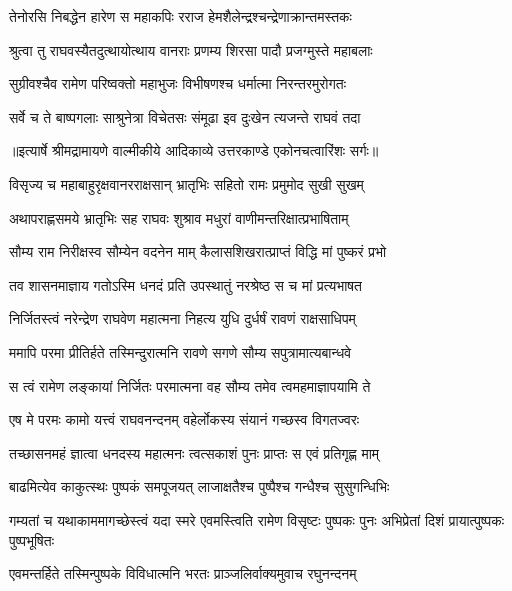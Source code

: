 \twolineshloka
{तेनोरसि निबद्धेन हारेण स महाकपिः}
{रराज हेमशैलेन्द्रश्चन्द्रेणाक्रान्तमस्तकः} %

\twolineshloka
{श्रुत्वा तु राघवस्यैतदुत्थायोत्थाय वानराः}
{प्रणम्य शिरसा पादौ प्रजग्मुस्ते महाबलाः} %

\twolineshloka
{सुग्रीवश्चैव रामेण परिष्वक्तो महाभुजः}
{विभीषणश्च धर्मात्मा निरन्तरमुरोगतः} %

\twolineshloka
{सर्वे च ते बाष्पगलाः साश्रुनेत्रा विचेतसः}
{संमूढा इव दुःखेन त्यजन्ते राघवं तदा} %


{॥इत्यार्षे श्रीमद्रामायणे वाल्मीकीये आदिकाव्ये उत्तरकाण्डे एकोनचत्वारिंशः सर्गः॥}


\twolineshloka
{विसृज्य च महाबाहुरृक्षवानरराक्षसान्}
{भ्रातृभिः सहितो रामः प्रमुमोद सुखी सुखम्} %

\twolineshloka
{अथापराह्णसमये भ्रातृभिः सह राघवः}
{शुश्राव मधुरां वाणीमन्तरिक्षात्प्रभाषिताम्} %

\twolineshloka
{सौम्य राम निरीक्षस्व सौम्येन वदनेन माम्}
{कैलासशिखरात्प्राप्तं विद्धि मां पुष्करं प्रभो} %

\twolineshloka
{तव शासनमाज्ञाय गतोऽस्मि धनदं प्रति}
{उपस्थातुं नरश्रेष्ठ स च मां प्रत्यभाषत} %

\twolineshloka
{निर्जितस्त्वं नरेन्द्रेण राघवेण महात्मना}
{निहत्य युधि दुर्धर्षं रावणं राक्षसाधिपम्} %

\twolineshloka
{ममापि परमा प्रीतिर्हते तस्मिन्दुरात्मनि}
{रावणे सगणे सौम्य सपुत्रामात्यबान्धवे} %

\twolineshloka
{स त्वं रामेण लङ्कायां निर्जितः परमात्मना}
{वह सौम्य तमेव त्वमहमाज्ञापयामि ते} %

\twolineshloka
{एष मे परमः कामो यत्त्वं राघवनन्दनम्}
{वहेर्लोकस्य संयानं गच्छस्व विगतज्वरः} %

\twolineshloka
{तच्छासनमहं ज्ञात्वा धनदस्य महात्मनः}
{त्वत्सकाशं पुनः प्राप्तः स एवं प्रतिगृह्ण माम्} %

\twolineshloka
{बाढमित्येव काकुत्स्थः पुष्पकं समपूजयत्}
{लाजाक्षतैश्च पुष्पैश्च गन्धैश्च सुसुगन्धिभिः} %

\threelineshloka
{गम्यतां च यथाकाममागच्छेस्त्वं यदा स्मरे}
{एवमस्त्विति रामेण विसृष्टः पुष्पकः पुनः}
{अभिप्रेतां दिशं प्रायात्पुष्पकः पुष्पभूषितः} %

\twolineshloka
{एवमन्तर्हिते तस्मिन्पुष्पके विविधात्मनि}
{भरतः प्राञ्जलिर्वाक्यमुवाच रघुनन्दनम्} %

